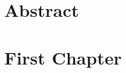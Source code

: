 
\chapter*{Abstract}
\thispagestyle{fancy}



\newpage
\tableofcontents
\thispagestyle{fancy}



\chapter{First Chapter}
\thispagestyle{fancy}

\begin{epigraphs}
\end{epigraphs}




% 



